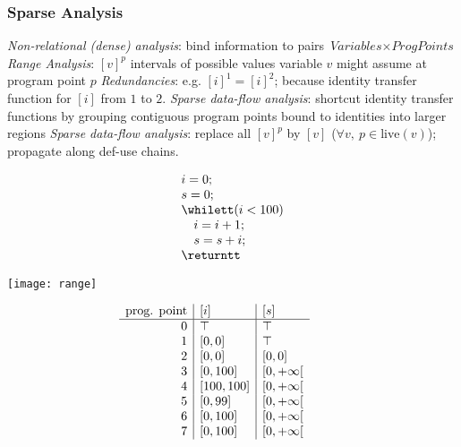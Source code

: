 \begin{frame}
\frametitle{Sparse Analysis}
\begin{block}{}
  \begin{overprint}
    \emph{Non-relational (dense) analysis}: bind information to pairs $\textit{Variables}\times \textit{ProgPoints}$
    \emph{Range Analysis}: $[v]^p$ intervals of possible values variable $v$ might assume at program point $p$
    \emph{Redundancies}: e.g. $[i]^1 = [i]^2$; because identity transfer function for $[i]$ from $1$ to $2$.  
    \emph{Sparse data-flow analysis}: shortcut identity transfer functions by grouping contiguous program points bound to identities into larger regions
    \emph{Sparse data-flow analysis}: replace all $[v]^p$ by $[v]$ ($\forall v,\ p\in \textrm{live}(v)$); propagate along def-use chains.
  \end{overprint}
\end{block}%


\vfill
\begin{minipage}[b]{0.2\textwidth}%
\small
\begin{equation*}
\begin{array}[b]{l}
i=0;\\
s=0;\\
\whilett (i<100)\\
\quad i=i+1;\\
\quad s=s+i;\\
\returntt
\end{array}
\end{equation*}
\vspace{1.5cm}
\end{minipage}
\begin{minipage}[b]{0.4\textwidth}%
\texttt{[image: range]}
\end{minipage}\hfill
\begin{minipage}[b]{0.35\textwidth}
\small
\begin{equation*}
\hspace{-1cm}
\begin{array}[b]{r|l|l}
\textrm{prog. point} & [i] & [s]\\ \hline
0 & \top & \top\\
1 & [0,0] & \top\\
2 & [0,0] & [0,0]\\
3 & [0,100] & [0, +\infty[\\
4 & [100,100] & [0,+\infty[\\
5 & [0,99] & [0,+\infty[\\
6 & [0,100] & [0,+\infty[\\
7 & [0,100] & [0,+\infty[\\
\end{array}
\end{equation*}
\vspace{0.5cm}
\end{minipage}
\end{frame}

